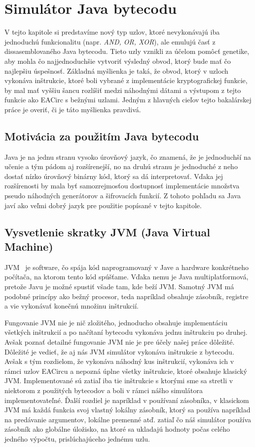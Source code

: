 \chapter{Simulátor Java bytecodu}
\label{chap:eacirc-jvmsim}

V tejto kapitole si predstavíme nový typ uzlov, ktoré nevykonávajú iba jednoduchú funkcionalitu (napr. \textit{AND, OR, XOR}), ale emulujú časť z dissasemblovaného Java bytecodu. Tieto uzly vznikli za účelom pomôcť genetike, aby mohla čo najjednoduchšie vytvoriť výsledný obvod, ktorý bude mať čo najlepšiu úspešnosť. Základná myšlienka je taká, že obvod, ktorý v uzloch vykonáva inštrukcie, ktoré boli vybrané z implementácie kryptografickej funkcie, by mal mať vyššiu šancu rozlíšiť medzi náhodnými dátami a výstupom z tejto funkcie ako EACirc s bežnými uzlami. Jedným z hlavných cieľov tejto bakalárskej práce je overiť, či je táto myšlienka pravdivá. 

\section{Motivácia za použitím Java bytecodu}
\label{sec:java-bytecode}

Java je na jednu stranu vysoko úrovňový jazyk, čo znamená, že je jednoduchší na učenie a tým pádom aj rozšírenejší, no na druhú stranu je jednoduché z neho dostať nízko úrovňový binárny kód, ktorý sa dá interpretovať. Vďaka jej rozšírenosti  by mala byť samozrejmosťou dostupnosť implementácie množstva pseudo náhodných generátorov a šifrovacích funkcií. Z tohoto pohľadu sa Java javí ako veľmi dobrý jazyk pre použitie popísané v tejto kapitole.

\section{Vysvetlenie skratky JVM (Java Virtual Machine)}
\label{sec:jvm}

JVM~\parencite{JVM} je software, čo spája kód naprogramovaný v Jave a hardware konkrétneho počítača, na ktorom tento kód spúšťame. Vďaka nemu je Java multiplatformová, pretože Javu je možné spustiť všade tam, kde beží JVM. Samotný JVM má podobné princípy ako bežný procesor, teda napríklad obsahuje zásobník, registre a vie vykonávať konečnú množinu inštrukcií.

Fungovanie JVM nie je nič zložitého, jednoducho obsahuje implementáciu všetkých inštrukcií a po načítaní bytecodu vykonáva jednu inštrukciu po druhej. Avšak poznať detailné fungovanie JVM nie je pre účely našej práce dôležité. Dôležité je vedieť, že aj nás JVM simulátor vykonáva inštrukcie z bytecodu. Avšak s tým rozdielom, že vykonáva náhodný kus inštrukcií, vykonáva ich v rámci uzlov EACircu a nepozná úplne všetky inštrukcie, ktoré obsahuje klasický JVM. Implementované sú zatiaľ iba tie inštrukcie s ktorými sme sa stretli v niektorom z použitých bytecodov a boli v rámci nášho simulátora implementovateľné. Ďalší rozdiel je napríklad v používaní zásobníka, v klasickom JVM má každá funkcia svoj vlastný lokálny zásobník, ktorý sa používa napríklad na predávanie argumentov, lokálne premenné atď. zatiaľ čo náš simulátor používa zásobník ako globálne úložisko, na ktoré sa ukladajú hodnoty počas celého jedného výpočtu, prislúchajúceho jednému uzlu.  

